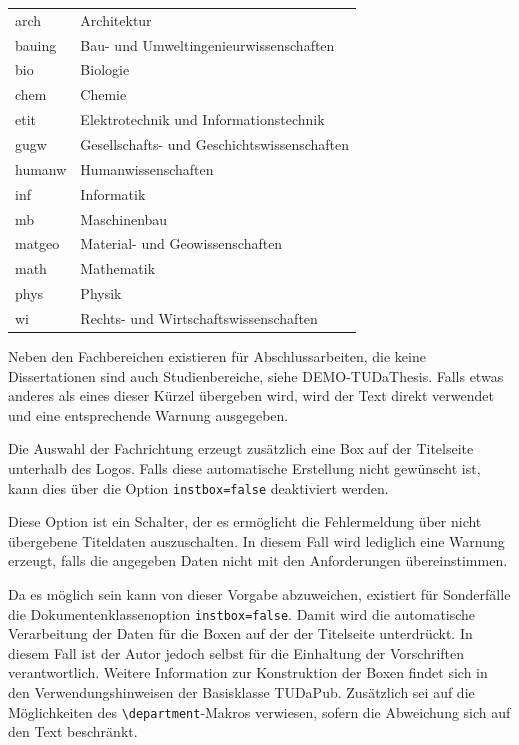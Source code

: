 \documentclass[
	ngerman,
	ruledheaders=chapter,%
	class=book,%
	thesis={
		type=dr,
		dr=rernat
	},
	accentcolor=9c,%
	custommargins=true,%
	marginpar=false,%
	fontsize=11pt,%
]{tudapub}
\let\code\texttt
\begin{document}
\begin{description}
	\begin{tabular}{@{}l@{${}\to{}$}l@{}}
		arch  & Architektur\\
		bauing& Bau- und Umweltingenieurwissenschaften\\
		bio   &Biologie\\
		chem  &Chemie\\
		etit  &Elektrotechnik und Informationstechnik\\
		gugw  &Gesellschafts- und Geschichtswissenschaften\\
		humanw&Humanwissenschaften\\
		inf   &Informatik\\
		mb    &Maschinenbau\\
		matgeo&Material- und Geowissenschaften\\
		math  &Mathematik\\
		phys  &Physik\\
		wi    &Rechts- und Wirtschaftswissenschaften
	\end{tabular}

	Neben den Fachbereichen existieren für Abschlussarbeiten, die keine Dissertationen sind auch Studienbereiche, siehe DEMO-TUDaThesis.
	Falls etwas anderes als eines dieser Kürzel übergeben wird, wird der Text direkt verwendet und eine entsprechende Warnung ausgegeben.

	Die Auswahl der Fachrichtung erzeugt zusätzlich eine Box auf der Titelseite unterhalb des Logos. Falls diese automatische Erstellung nicht gewünscht ist, kann dies über die Option \code{instbox=false} deaktiviert werden.
\item[ignore-missing-data] Diese Option ist ein Schalter, der es ermöglicht die Fehlermeldung über nicht übergebene Titeldaten auszuschalten. In diesem Fall wird lediglich eine Warnung erzeugt, falls die angegeben Daten nicht mit den Anforderungen übereinstimmen.
\end{description}

Da es möglich sein kann von dieser Vorgabe abzuweichen, existiert für Sonderfälle die Dokumentenklassenoption \code{instbox=false}. Damit wird die automatische Verarbeitung der Daten für die Boxen auf der der Titelseite unterdrückt. In diesem Fall ist der Autor jedoch selbst für die Einhaltung der Vorschriften verantwortlich. Weitere Information zur Konstruktion der Boxen findet sich in den Verwendungshinweisen der Basisklasse TUDaPub. Zusätzlich sei auf die Möglichkeiten des \code{\textbackslash{}department}-Makros verwiesen, sofern die Abweichung sich auf den Text beschränkt.
\end{document}
